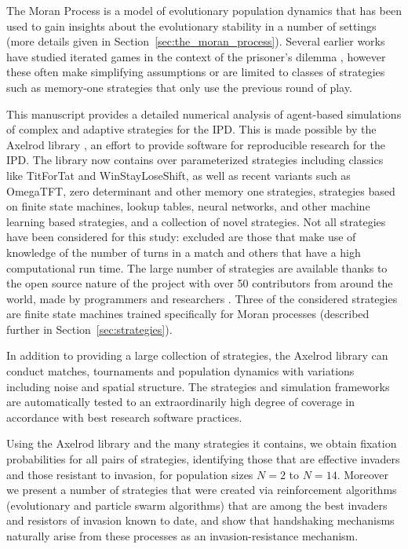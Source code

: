 \documentclass[10pt,journal]{IEEEtran}
\begin{document}
The Moran Process \cite{Moran1957} is a model of
evolutionary population dynamics that has been used to gain insights about the
evolutionary stability in a number of settings (more details given in
Section~\ref{sec:the_moran_process}).
Several earlier
works have studied iterated games in the context of the prisoner's dilemma
\cite{Nowak, stewart2013extortion}, however these often make simplifying assumptions
or are limited to classes of strategies
such as memory-one strategies that only use the previous round of play.

This manuscript provides a detailed numerical analysis of agent-based simulations
of \textbf{}complex and adaptive strategies for the
IPD\@. This is made possible by the Axelrod library \cite{axelrodproject}, an
effort to provide software for reproducible research for the IPD\@. The library
now contains over parameterized
strategies including classics like TitForTat and WinStayLoseShift, as well as
recent variants such as OmegaTFT, zero determinant and other memory one
strategies, strategies based on finite state machines, lookup tables, neural
networks, and other machine learning based strategies, and a collection of novel
strategies. Not all strategies have been considered for this study: excluded
are those that make use of knowledge of the number of turns in a match
and others that have a high
computational run time. The large number of strategies are available thanks to
the open source nature of the project with over 50 contributors from around the
world, made by programmers and researchers \cite{Knight2016}. Three of the considered
strategies are finite state machines trained specifically for Moran processes
(described further in Section~\ref{sec:strategies}).

In addition to providing a large collection of strategies, the Axelrod library
can conduct matches, tournaments and population
dynamics with variations including noise and spatial structure.
The strategies and simulation frameworks are
automatically tested to an extraordinarily high degree of coverage in accordance
with best research software practices.

Using the Axelrod library and the many strategies it contains, we obtain
fixation probabilities for all pairs of strategies, identifying
those that are effective invaders and those resistant to invasion, for
population sizes $N=2$ to $N=14$. Moreover we present a number of strategies
that were created via reinforcement algorithms (evolutionary and particle
swarm algorithms) that are among the best invaders and resistors of invasion
known to date, and show that handshaking mechanisms naturally arise from these
processes as an invasion-resistance mechanism.
\end{document}
